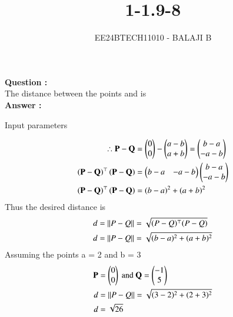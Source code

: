 \documentclass[journal]{IEEEtran}
\begin{document}

\vspace{3cm}

\title{1-1.9-8}
\author{EE24BTECH11010 - BALAJI B
}
{\let\newpage\relax\maketitle}

\renewcommand{\thefigure}{\theenumi}
\renewcommand{\thetable}{\theenumi}
\setlength{\intextsep}{10pt} %


\renewcommand{\thetable}{\theenumi}

\textbf{Question :} \\ 
The distance between the points  and  is   \\

\textbf{Answer :} \\

\begin{table}[h!]    
  \centering
  
  \caption{Input parameters}
  \label{tab1.9.19.1}
\end{table}
\begin{align}
	\therefore\mathbf{P} - \mathbf{Q} &= \begin{pmatrix}0 \\ 0 \end{pmatrix} - \begin{pmatrix}a - b \\ a + b\end{pmatrix} = \begin{pmatrix}b - a \\ -a -b\end{pmatrix} \\
	\left(\mathbf{P - Q}\right)^\top \left(\mathbf{P - Q}\right) &= \begin{pmatrix}b-a & -a-b\end{pmatrix}\begin{pmatrix}b-a \\ -a-b\end{pmatrix} \\
    \left(\mathbf{P - Q}\right)^\top \left(\mathbf{P - Q}\right) &= (b - a)^2 + (a + b)^2
\end{align} 
Thus the desired distance is 
\begin{align}
	d &= \left\lVert P - Q\right\rVert = \sqrt{(P - Q)^\top (P - Q)} \\
	d &= \left\lVert P - Q\right\rVert = \sqrt{(b - a)^2 + (a + b)^2}
\end{align}
Assuming the points a = 2 and b = 3 
\begin{align}
    \mathbf{P} &= \begin{pmatrix}0 \\ 0\end{pmatrix} \text{ and }\mathbf{Q} = \begin{pmatrix}-1 \\ 5\end{pmatrix} \\
    d &= \left\lVert P - Q\right\rVert = \sqrt{(3 - 2)^2 + (2 + 3)^2}\\
    d &= \sqrt{26}
\end{align}
\end{document}
